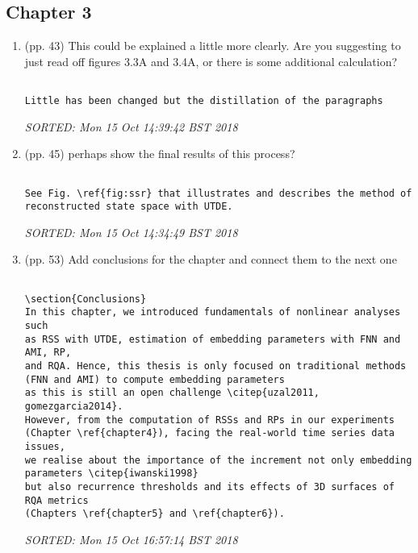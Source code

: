 \documentclass[10pt]{article}
\begin{document}
\subsection{Chapter 3}

\begin{enumerate}

\item (pp. 43) This could be explained a little more clearly.
	Are you suggesting to just read off figures 3.3A and 3.4A,
	or there is some additional calculation?


\begin{verbatim}

Little has been changed but the distillation of the paragraphs

\end{verbatim}
\textit{
SORTED: 
Mon 15 Oct 14:39:42 BST 2018
}
\\



\item (pp. 45) perhaps show the final results of this process?


\begin{verbatim}

See Fig. \ref{fig:ssr} that illustrates and describes the method of 
reconstructed state space with UTDE.

\end{verbatim}
\textit{
SORTED: 
Mon 15 Oct 14:34:49 BST 2018
}
\\





\item (pp. 53) Add conclusions for the chapter and connect them to 
	the next one


\begin{verbatim}

\section{Conclusions}
In this chapter, we introduced fundamentals of nonlinear analyses such 
as RSS with UTDE, estimation of embedding parameters with FNN and AMI, RP, 
and RQA. Hence, this thesis is only focused on traditional methods 
(FNN and AMI) to compute embedding parameters 
as this is still an open challenge \citep{uzal2011, gomezgarcia2014}. 
However, from the computation of RSSs and RPs in our experiments
(Chapter \ref{chapter4}), facing the real-world time series data issues,
we realise about the importance of the increment not only embedding 
parameters \citep{iwanski1998} 
but also recurrence thresholds and its effects of 3D surfaces of RQA metrics
(Chapters \ref{chapter5} and \ref{chapter6}).

\end{verbatim}
\textit{
SORTED: 
Mon 15 Oct 16:57:14 BST 2018
}
\\





\end{enumerate}
\end{document}
